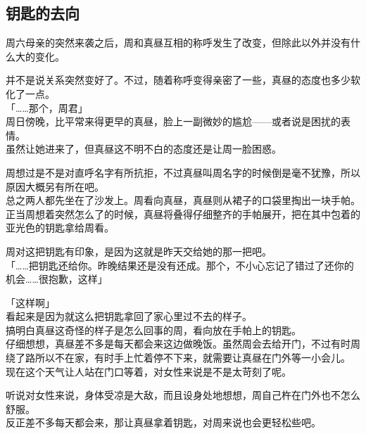 \subsection{钥匙的去向}

周六母亲的突然来袭之后，周和真昼互相的称呼发生了改变，但除此以外并没有什么大的变化。

并不是说关系突然变好了。不过，随着称呼变得亲密了一些，真昼的态度也多少软化了一点。\\

「……那个，周君」\\

周日傍晚，比平常来得更早的真昼，脸上一副微妙的尴尬——或者说是困扰的表情。\\

虽然让她进来了，但真昼这不明不白的态度还是让周一脸困惑。

周想过是不是对直呼名字有所抗拒，不过真昼叫周名字的时候倒是毫不犹豫，所以原因大概另有所在吧。\\

总之两人都先坐在了沙发上。周看向真昼，真昼则从裙子的口袋里掏出一块手帕。\\

正当周想着突然怎么了的时候，真昼将叠得仔细整齐的手帕展开，把在其中包着的亚光色的钥匙拿给周看。

周对这把钥匙有印象，是因为这就是昨天交给她的那一把吧。\\

「……把钥匙还给你。昨晚结果还是没有还成。那个，不小心忘记了错过了还你的机会……很抱歉，这样」

「这样啊」\\

看起来是因为就这么把钥匙拿回了家心里过不去的样子。\\

搞明白真昼这奇怪的样子是怎么回事的周，看向放在手帕上的钥匙。\\

仔细想想，真昼差不多是每天都会来这边做晚饭。虽然周会去给开门，不过有时周绕了路所以不在家，有时手上忙着停不下来，就需要让真昼在门外等一小会儿。\\

现在这个天气让人站在门口等着，对女性来说是不是太苛刻了呢。

听说对女性来说，身体受凉是大敌，而且设身处地想想，周自己杵在门外也不怎么舒服。\\

反正差不多每天都会来，那让真昼拿着钥匙，对周来说也会更轻松些吧。\\

